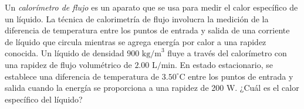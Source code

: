 \item Un \textit{calorímetro de flujo} es un aparato que se usa para medir el calor específico de un líquido. La técnica de calorimetría de flujo involucra la medición de la diferencia de temperatura entre los puntos de entrada y salida de una corriente de líquido que circula mientras se agrega energía por calor a una rapidez conocida. Un líquido de densidad $900\text{ kg/m}^3$ fluye a través del calorímetro con una rapidez de flujo volumétrico de $2.00\text{ L/min}$. En estado estacionario, se establece una diferencia de temperatura de $3.50^\circ\text{C}$ entre los puntos de entrada y salida cuando la energía se proporciona a una rapidez de 200 W. ¿Cuál es el calor específico del líquido?
